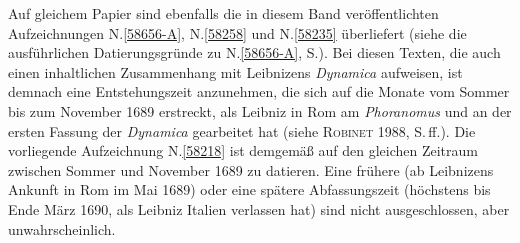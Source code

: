 Auf gleichem Papier sind ebenfalls die in diesem Band veröffentlichten Aufzeichnungen N.\;\ref{58656-A}, N.\;\ref{58258} und N.\;\ref{58235} überliefert %
(siehe die ausführlichen Datierungsgründe zu N.\;\ref{58656-A}, S.\;\pageref{58656-A_dat}).
Bei diesen Texten, %
die auch einen inhaltlichen Zusammenhang mit Leibnizens \textit{Dynamica} aufweisen, ist demnach eine Entstehungszeit anzunehmen, die sich auf die Monate vom Sommer bis zum November 1689 erstreckt, als Leibniz in Rom am \textit{Phoranomus}\cite{01402} und an der ersten Fassung der \textit{Dynamica}\cite{01354} gearbeitet hat (siehe \textsc{Robinet} 1988, S.\,ff.).\cite{01240}
Die vorliegende Aufzeichnung N.\;\ref{58218} ist demgemäß auf den gleichen Zeitraum zwischen Sommer und November 1689 zu datieren.
Eine frühere (ab Leibnizens Ankunft in Rom im Mai 1689) oder eine spätere Abfassungszeit (höchstens bis Ende März 1690, als Leibniz Italien verlassen hat) sind nicht ausgeschlossen, aber unwahrscheinlich.%
\pend%
%
\frenchspacing%
\normalsize%
\newpage%
